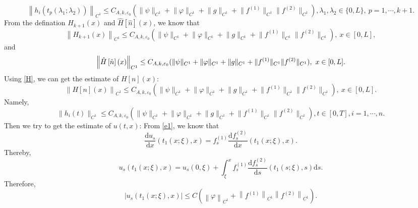 \documentclass[a4paper,reqno,11pt]{amsart}
\numberwithin{equation}{section} %
\begin{document}
\begin{equation}\label{estimate of h_i at t_p}
	\left\| h_i(t_p(\lambda _1;\lambda _2)) \right\|_{C^1} \leq C_{A,k,\varepsilon _0}(\lVert \psi \rVert _{C^1}+\lVert \varphi  \rVert _{C^1}+  \lVert g \rVert _{C^1}+\lVert f^{(1)} \rVert _{C^1}\lVert f^{(2)} \rVert _{C^1}) ,\lambda _1,\lambda _2 \in \{ 0,L \} ,\ p=1,\cdots,k+1.
\end{equation}
From the defination $H_{k+1}(x)$ and $\hat{H}\left[ \hat{n} \right] \left( x \right)$, we know that
\begin{equation}\label{estimate of H}
	\left\| H_{k+1}(x) \right\|_{C^1} \leq C_{A,k,\varepsilon _0}(\lVert \psi \rVert _{C^1}+\lVert \varphi  \rVert _{C^1}+  \lVert g \rVert _{C^1}+\lVert f^{(1)} \rVert _{C^1}\lVert f^{(2)} \rVert _{C^1}) ,\ x\in [0,L],
\end{equation}
and
\begin{equation}\label{estimate of hat{H}}
	\left\| \hat{H}\left[ \hat{n} \right] \left( x \right) \right\|_{C^1} \leq C_{A,k,\varepsilon _0}(\lVert \psi \rVert _{C^1}+\lVert \varphi  \rVert _{C^1}+  \lVert g \rVert _{C^1}+\lVert f^{(1)} \rVert _{C^1}\lVert f^{(2)} \rVert _{C^1}) ,\ x\in [0,L].
\end{equation}
Using \eqref{H}, we can get the estimate of $H\left[ n \right] \left( x \right)$:
\begin{equation}\label{estimate of H[n]}
	\left\| H\left[ n \right] \left( x \right) \right\|_{C^1} \leq C_{A,k,\varepsilon _0}(\lVert \psi \rVert _{C^1}+\lVert \varphi  \rVert _{C^1}+  \lVert g \rVert _{C^1}+\lVert f^{(1)} \rVert _{C^1}\lVert f^{(2)} \rVert _{C^1}) ,\ x\in [0,L].
\end{equation}
Namely, 
\begin{equation}\label{estimate of h}	
\lVert h_i(t) \rVert _{C^1}  \leq C_{A,k,\varepsilon _0}(\lVert \psi \rVert _{C^1}+\lVert \varphi  \rVert _{C^1}+  \lVert g \rVert _{C^1}+\lVert f^{(1)} \rVert _{C^1}\lVert f^{(2)} \rVert _{C^1}) ,t \in [0,T],  i=1,\cdots,n.
\end{equation}
Then we try to get the estimate of $u(t,x)$:
From \eqref{e1}, we know that
$$
\frac{\mathrm{d}u_s}{\mathrm{d}x}\left( t_1(x;\xi ),x \right) =f_{s}^{(1)}\frac{\mathrm{d}f_{s}^{(2)}}{\mathrm{d}x}\left( t_1(x;\xi ),x \right) .
$$
Thereby,
$$
u_s\left( t_1\left( x;\xi \right) ,x \right) =u_s(0,\xi )+\int_{\xi}^x{f_{s}^{(1)}\frac{\mathrm{d}f_{s}^{(2)}}{\mathrm{d}s}\left( t_1\left( s;\xi \right) ,s \right) \mathrm{d}s}.
$$
Therefore,
$$
\left| u_s\left( t_1(x;\xi ),x \right) \right|\leq C\left( \left\| \varphi \right\| _{C^1}+\left\| f^{(1)} \right\| _{C^1}\left\| f^{(2)} \right\| _{C^1} \right) .
$$
\end{document}

